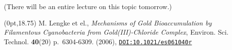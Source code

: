 \documentclass[10pt, xcolor=x11names, compress]{beamer}
\begin{document}
\begin{frame}
\begin{columns}
\begin{column}{0.5\linewidth}
    \end{column}
  \end{columns}
  \begin{flushright}
    \scriptsize (There will be an entire lecture on this topic tomorrow.)
  \end{flushright}
  \begin{textblock*}{0.5\linewidth}(0pt,18.75\TPVertModule) 
    \tiny
    M. Lengke et el., \textit{Mechanisms of Gold Bioaccumulation by
      Filamentous Cyanobacteria from Gold(III)-Chloride Complex},
    Environ. Sci. Technol. \textbf{40}(20) p.~6304-6309. (2006),
    \href{http://dx.doi.org/10.1021/es061040r}
    {\color{Blue4}\texttt{DOI:10.1021/es061040r}}
  \end{textblock*}
\end{frame}
\end{document}
